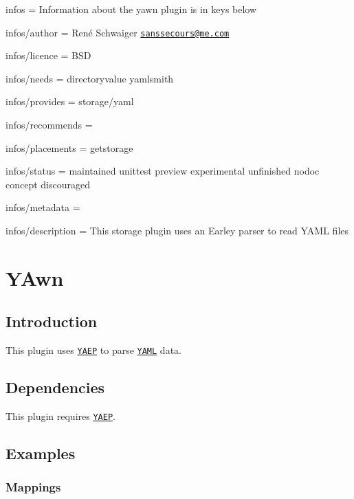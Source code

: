 
\begin{DoxyItemize}
\item infos = Information about the yawn plugin is in keys below
\item infos/author = René Schwaiger \href{mailto:sanssecours@me.com}{\tt sanssecours@me.\+com}
\item infos/licence = B\+SD
\item infos/needs = directoryvalue yamlsmith
\item infos/provides = storage/yaml
\item infos/recommends =
\item infos/placements = getstorage
\item infos/status = maintained unittest preview experimental unfinished nodoc concept discouraged
\item infos/metadata =
\item infos/description = This storage plugin uses an Earley parser to read Y\+A\+ML files
\end{DoxyItemize}\hypertarget{md_src_plugins_yawn_README_src_plugins_yawn_README_md}{}\section{Y\+Awn}\label{md_src_plugins_yawn_README_src_plugins_yawn_README_md}
\subsection*{Introduction}

This plugin uses \href{https://github.com/vnmakarov/yaep}{\tt Y\+A\+EP} to parse \href{http://yaml.org}{\tt Y\+A\+ML} data.

\subsection*{Dependencies}

This plugin requires \href{https://github.com/vnmakarov/yaep#installing}{\tt Y\+A\+EP}.

\subsection*{Examples}

\subsubsection*{Mappings}


